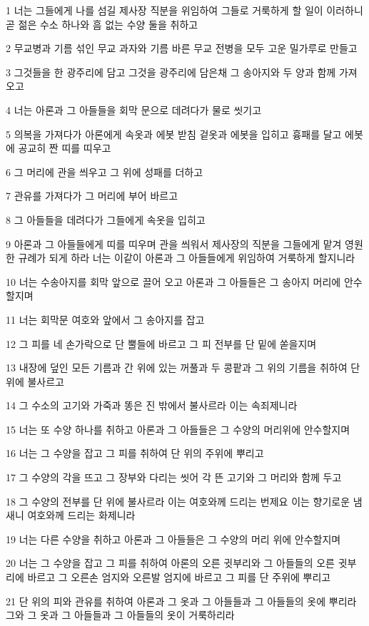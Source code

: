 \par 1 너는 그들에게 나를 섬길 제사장 직분을 위임하여 그들로 거룩하게 할 일이 이러하니 곧 젊은 수소 하나와 흠 없는 수양 둘을 취하고
\par 2 무교병과 기름 섞인 무교 과자와 기름 바른 무교 전병을 모두 고운 밀가루로 만들고
\par 3 그것들을 한 광주리에 담고 그것을 광주리에 담은채 그 송아지와 두 양과 함께 가져 오고
\par 4 너는 아론과 그 아들들을 회막 문으로 데려다가 물로 씻기고
\par 5 의복을 가져다가 아론에게 속옷과 에봇 받침 겉옷과 에봇을 입히고 흉패를 달고 에봇에 공교히 짠 띠를 띠우고
\par 6 그 머리에 관을 씌우고 그 위에 성패를 더하고
\par 7 관유를 가져다가 그 머리에 부어 바르고
\par 8 그 아들들을 데려다가 그들에게 속옷을 입히고
\par 9 아론과 그 아들들에게 띠를 띠우며 관을 씌워서 제사장의 직분을 그들에게 맡겨 영원한 규례가 되게 하라 너는 이같이 아론과 그 아들들에게 위임하여 거룩하게 할지니라
\par 10 너는 수송아지를 회막 앞으로 끌어 오고 아론과 그 아들들은 그 송아지 머리에 안수할지며
\par 11 너는 회막문 여호와 앞에서 그 송아지를 잡고
\par 12 그 피를 네 손가락으로 단 뿔들에 바르고 그 피 전부를 단 밑에 쏟을지며
\par 13 내장에 덮인 모든 기름과 간 위에 있는 꺼풀과 두 콩팥과 그 위의 기름을 취하여 단 위에 불사르고
\par 14 그 수소의 고기와 가죽과 똥은 진 밖에서 불사르라 이는 속죄제니라
\par 15 너는 또 수양 하나를 취하고 아론과 그 아들들은 그 수양의 머리위에 안수할지며
\par 16 너는 그 수양을 잡고 그 피를 취하여 단 위의 주위에 뿌리고
\par 17 그 수양의 각을 뜨고 그 장부와 다리는 씻어 각 뜬 고기와 그 머리와 함께 두고
\par 18 그 수양의 전부를 단 위에 불사르라 이는 여호와께 드리는 번제요 이는 향기로운 냄새니 여호와께 드리는 화제니라
\par 19 너는 다른 수양을 취하고 아론과 그 아들들은 그 수양의 머리 위에 안수할지며
\par 20 너는 그 수양을 잡고 그 피를 취하여 아론의 오른 귓부리와 그 아들들의 오른 귓부리에 바르고 그 오른손 엄지와 오른발 엄지에 바르고 그 피를 단 주위에 뿌리고
\par 21 단 위의 피와 관유를 취하여 아론과 그 옷과 그 아들들과 그 아들들의 옷에 뿌리라 그와 그 옷과 그 아들들과 그 아들들의 옷이 거룩하리라
